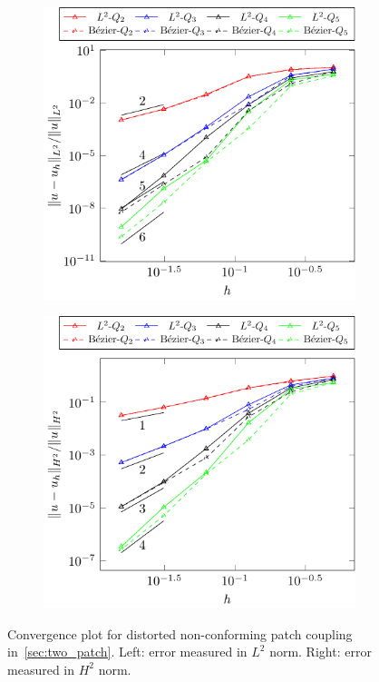 \documentclass[preprint,12pt]{elsarticle}
\theoremstyle{remark}
\begin{document}
\begin{figure}[hbt]
    \centering
    \begin{subfigure}[b]{0.48\textwidth}
        \includegraphics[width=\textwidth]{two_patch_biharmonic_distorted}
    \end{subfigure}
    \begin{subfigure}[b]{0.48\textwidth}
        \includegraphics[width=\textwidth]{two_patch_biharmonic_distorted_H2}
    \end{subfigure}
	\caption{Convergence plot for distorted non-conforming patch coupling in~\ref{sec:two_patch}. Left: error measured in $L^2$ norm. Right: error measured in $H^2$ norm.}\label{fig:two_patc_biharmonic_convergence_distorted}
\end{figure}
\end{document}
